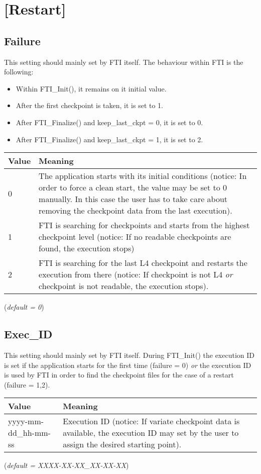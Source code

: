 \documentclass{refrep}
\begin{document}
\section{[Restart]}\label{sec:restart}
\subsection{Failure}\label{subsec:failure}
This setting should mainly set by FTI itself. The behaviour within FTI is the following:
\begin{itemize}
\item Within {\asciifamily FTI\_Init()}, it remains on it initial value.
\item After the first checkpoint is taken, it is set to 1.
\item After {\asciifamily FTI\_Finalize()} and keep\_last\_ckpt = 0, it is set to 0.
\item After {\asciifamily FTI\_Finalize()} and keep\_last\_ckpt = 1, it is set to 2.
\end{itemize}
\begin{center}
\begin{tabular}[h!]{|p{}|p{}|}
\hline
\textbf{Value} & \textbf{Meaning} \\ \hline
0 & The application starts with its initial conditions (notice: In order to force a clean start, the value may be set to 0 manually. In this case the user has to take care about removing the checkpoint data from the last execution).  \\ \hline
1 & FTI is searching for checkpoints and starts from the highest checkpoint level (notice: If no readable checkpoints are found, the execution stops) \\ \hline
2 & FTI is searching for the last L4 checkpoint and restarts the execution from there (notice: If checkpoint is not L4 \emph{or} checkpoint is not readable, the execution stops).  \\ \hline
\end{tabular}
\end{center}
(\textit{default = 0})
\subsection{Exec\_ID}\label{subsec:execid}
This setting should mainly set by FTI itself. During {\asciifamily FTI\_Init()} the execution ID is set if the application starts for the first time (failure = 0) \emph{or} the execution ID is used by FTI in order to find the checkpoint files for the case of a restart (failure = 1,2).
\begin{center}
\begin{tabular}[h!]{|p{}|p{}|}
\hline
\textbf{Value} & \textbf{Meaning} \\ \hline
yyyy-mm-dd\_hh-mm-ss & Execution ID (notice: If variate checkpoint data is available, the execution ID may set by the user to assign the desired starting point). \\ \hline
\end{tabular}
\end{center}
(\textit{default = XXXX-XX-XX\_XX-XX-XX})
\end{document}
